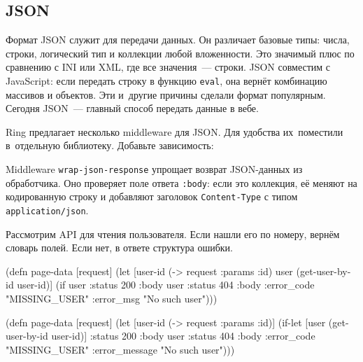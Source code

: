 \subsection{JSON}


Формат JSON служит для передачи данных. Он различает базовые типы: числа,
строки, логический тип и коллекции любой вложенности. Это значимый плюс по
сравнению с INI или XML, где все значения~--- строки. JSON совместим с JavaScript:
если передать строку в функцию \verb|eval|, она вернёт комбинацию массивов
и объектов. Эти и~другие причины сделали формат популярным. Сегодня JSON~---
главный способ передать данные в вебе.

Ring предлагает несколько middleware для JSON. Для удобства их~поместили
в~отдельную библиотеку. Добавьте зависимость:

\begin{english}
  \begin{clojure}
  \end{clojure}
\end{english}


Middleware \verb|wrap-json-response| упрощает возврат JSON-дан\-ных из
обработчика. Оно проверяет поле ответа \verb|:body|: если это коллекция, её
меняют на кодированную строку и добавляют заголовок \verb|Content-Type| с типом
\verb|application/json|.

Рассмотрим API для чтения пользователя. Если нашли его по номеру, вернём
словарь полей. Если нет, в ответе структура ошибки.

\ifnarrow

\begin{english}
  \begin{clojure}
(defn page-data [request]
  (let [user-id (-> request :params :id)
        user (get-user-by-id user-id)]
    (if user
      {:status 200 :body user}
      {:status 404
       :body
       {:error_code "MISSING_USER"
        :error_msg "No such user"}})))
  \end{clojure}
\end{english}

\else

\begin{english}
  \begin{clojure}
(defn page-data [request]
  (let [user-id (-> request :params :id)]
    (if-let [user (get-user-by-id user-id)]
      {:status 200 :body user}
      {:status 404
       :body {:error_code "MISSING_USER"
              :error_message "No such user"}})))
  \end{clojure}
\end{english}

